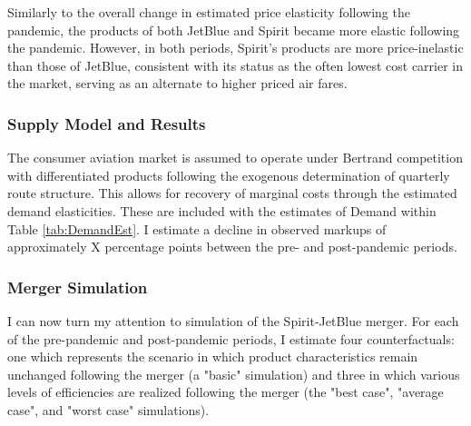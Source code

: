 \documentclass{article}
\begin{document}
	
	Similarly to the overall change in estimated price elasticity following the pandemic, the products of both JetBlue and Spirit became more elastic following the pandemic. However, in both periods, Spirit's products are more price-inelastic than those of JetBlue, consistent with its status as the often lowest cost carrier in the market, serving as an alternate to higher priced air fares.  
	
	\subsubsection{Supply Model and Results}
	\label{sec:Analysis_Supply}
	The consumer aviation market is assumed to operate under Bertrand competition with differentiated products following the exogenous determination of quarterly route structure. This allows for recovery of marginal costs through the estimated demand elasticities.  These are included with the estimates of Demand within Table \ref{tab:DemandEst}. I estimate a decline in observed markups of approximately X percentage points between the pre- and post-pandemic periods. 
	
	
	\subsubsection{Merger Simulation}
	\label{sec:Analysis_Merger}
	I can now turn my attention to simulation of the Spirit-JetBlue merger. For each of the pre-pandemic and post-pandemic periods, I estimate four counterfactuals: one which represents the scenario in which product characteristics remain unchanged following the merger (a "basic" simulation) and three in which various levels of efficiencies are realized following the merger (the "best case", "average case", and "worst case" simulations).
	
\end{document}
